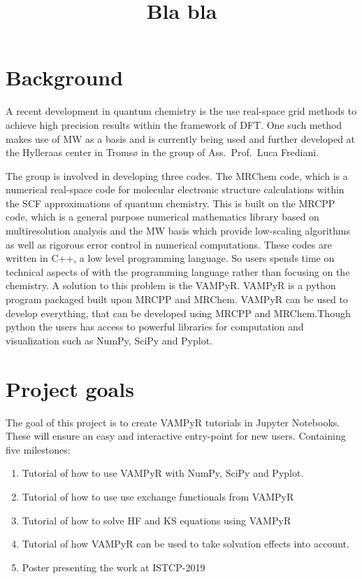 \documentclass[12pt]{article}
\begin{document}
\title{Bla bla}

\maketitle

\section{Background}

A recent development in quantum chemistry is the use real-space grid
methods to achieve high precision results within the framework of
\ac{DFT}. One such method makes use of \ac{MW} as a
basis\cite{harrison2003multiresolution}
and is currently being used and further developed at the Hylleraas
center in Tromsø in the group of Ass.~Prof.~Luca Frediani.

The group is involved in developing three codes. The \ac{MRChem}\cite{mrchem} code, which is
a numerical real-space code for molecular electronic structure calculations
within the \ac{SCF} approximations of quantum chemistry. This is built on
the \ac{MRCPP}\cite{mrcpp} code, which is a general purpose numerical mathematics library
based on multiresolution analysis and the \ac{MW} basis which provide
low-scaling algorithms as well as rigorous error control in numerical
computations. These codes are written in C++, a low level programming language.
So users spends time on technical aspects of with the programming
language rather than focusing on the chemistry. A solution to this problem
is the \ac{VAMPyR}\cite{vampyr}. \ac{VAMPyR} is a python program packaged built upon \ac{MRCPP}
and \ac{MRChem}. \ac{VAMPyR} can be used to develop everything, that
can be developed using \ac{MRCPP} and \ac{MRChem}.Though
python the users has access to powerful libraries for computation and
visualization such as NumPy, SciPy and Pyplot.

\section{Project goals}
The goal of this project is to create \ac{VAMPyR} tutorials in Jupyter Notebooks.
These will ensure an easy and interactive entry-point
for new users. Containing five milestones:

\begin{enumerate}
    \item Tutorial of how to use  \ac{VAMPyR} with NumPy, SciPy and Pyplot.
    \item Tutorial of how to use use exchange functionals from \ac{VAMPyR}
    \item Tutorial of how to solve \ac{HF} and \ac{KS} equations using \ac{VAMPyR}
    \item Tutorial of how \ac{VAMPyR} can be used to take solvation effects into
    account.
    \item Poster presenting the work at ISTCP-2019\cite{istcp}
\end{enumerate}
\end{document}
